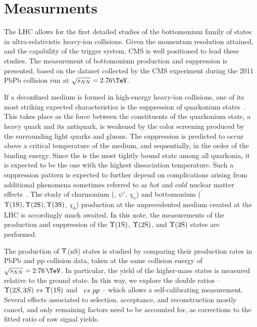 
\chapter{Measurments}
The LHC %
allows for the first detailed studies of the bottomonium family of states in ultra-relativistic heavy-ion collisions.   
Given the momentum resolution attained, and the capability of the trigger system,  CMS is well positioned to lead these studies. 
%
The measurement of bottomonium production and suppression is presented, based on the dataset collected by the CMS experiment during the 2011 PbPb collision run at  $\sqrtsnn = 2.76\TeV$. 


If a deconfined medium is formed in high-energy heavy-ion collisions, one of its most striking expected characteristics is the suppression of quarkonium states~\cite{Matsui:1986dk}. 
This takes place as the force between the constituents of the quarkonium state, a heavy quark and its antiquark, is weakened by the color screening produced by the surrounding light quarks and gluons.
 The suppression is predicted to occur above a critical temperature of the medium, and sequentially, in the
order of the \QQbar binding energy. 
Since the \PgUa is the most tightly bound state among all quarkonia, it is expected to be the one
with the highest dissociation temperature. %
Such a suppression pattern is expected to further depend on complications arising from additional phenomena sometimes referred to as $hot$ and $cold$ nuclear matter effects~\cite{Brambilla:2010cs,Vogt:2010aa}. 
%
The study of charmonium (\Jpsi, $\psi'$, $\chi_c$) and bottomonium ($\Upsilon\text{(1S)}, \Upsilon\text{(2S)}, \Upsilon\mathrm{(3S)}$, $\chi_b$) production at the unprecedented medium created at the LHC is accordingly much awaited.  
In this note, the measurements of the production and suppression of the $\Upsilon\text{(1S)}$,  $\Upsilon\text{(2S)}$, and  $\Upsilon\mathrm{(3S)}$ states are performed. 

%
The production of $\Upsilon$(nS) states is studied by comparing their production rates in PbPb and pp collision data, taken at the same collision energy of $\sqrt{s_{NN}}=2.76\,\TeV$.
In particular, the yield of the higher-mass states is measured relative to the ground state. In this way, we explore the double ratios  --  $\Upsilon(2S,3S)~vs~\Upsilon\text{(1S)}$ and \PbPb~$vs~{pp}$ -- 
which allows a self-calibrating measurement.  
%
Several effects associated to selection, acceptance, and reconstruction mostly cancel, and only remaining factors need to be accounted for,  as corrections to the fitted ratio of raw signal yields.  


